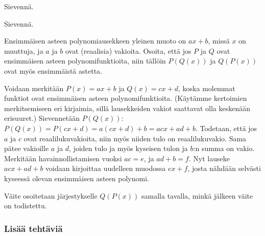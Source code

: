 \begin{tehtavasivu}
\begin{tehtava}
    Sievennä.
    \begin{vastaus}
    \end{vastaus}
\end{tehtava}

\begin{tehtava}
    Sievennä.
    \begin{vastaus}
    \end{vastaus}
\end{tehtava}

\begin{tehtava}
Ensimmäisen asteen polynomiausekkeen yleinen muoto on $ax+b$, missä $x$ on muuttuja, ja $a$ ja $b$ ovat (reaalisia) vakioita. Osoita, että jos $P$ ja $Q$ ovat ensimmäisen asteen polynomifunktioita, niin tällöin $P(Q(x))$ ja $Q(P(x))$ ovat myös ensimmäistä astetta.

	\begin{vastaus}
Voidaan merkitään $P(x)=ax+b$ ja $Q(x)=cx+d$, koska molemmat funktiot ovat ensimmäisen asteen polynomifunktioita. (Käytämme kertoimien merkitsemiseen eri kirjaimia, sillä lausekkeiden vakiot saattavat olla keskenään erisuuret.) Sievennetään $P(Q(x))$: $P(Q(x))=P(cx+d)=a(cx+d)+b=acx+ad+b$. Todetaan, että jos $a$ ja $c$ ovat reaalilukuvakioita, niin myös niiden tulo on reaalilukuvakio. Sama pätee vakioille $a$ ja $d$, joiden tulo ja myös kyseisen tulon ja $b$:n summa on vakio. Merkitään havainnollistamisen vuoksi $ac=e$, ja $ad+b=f$. Nyt lauseke $acx+ad+b$ voidaan kirjoittaa uudelleen muodossa $ex+f$, josta nähdään selvästi kyseessä olevan ensimmäisen asteen polynomi.

Väite osoitetaan järjestykselle $Q(P(x))$ samalla tavalla, minkä jälkeen väite on todistettu.

	\end{vastaus}
\end{tehtava}

\subsubsection*{Lisää tehtäviä}


\end{tehtavasivu}
